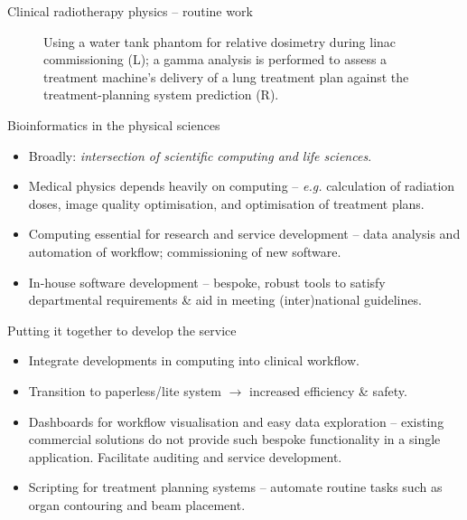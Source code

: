 \documentclass[final, unknownkeysallowed]{beamer}
\begin{document}
\begin{frame}{}
\begin{textblock}{19.5}
\begin{block}{Clinical radiotherapy physics -- routine work}
\begin{figure}
            \caption*{Using a water tank phantom for relative dosimetry during linac commissioning (L); a gamma analysis is performed to assess a treatment machine's delivery of a lung treatment plan against the treatment-planning system prediction (R).}\label{fig:watertank}
        \end{figure}
    \end{block}
%
    \begin{block}{Bioinformatics in the physical sciences}
        \begin{itemize}
            \item Broadly: \textit{intersection of scientific computing and life sciences}.
            \item Medical physics depends heavily on computing -- \textit{e.g.} calculation of radiation doses, image quality optimisation, and optimisation of treatment plans.
            \item Computing essential for research and service development -- data analysis and automation of workflow; commissioning of new software.
            \item In-house software development -- bespoke, robust tools to satisfy departmental requirements \& aid in meeting (inter)national guidelines.
        \end{itemize}
    \end{block}
%
    \begin{block}{Putting it together to develop the service}
        \begin{itemize}
            \item Integrate developments in computing into clinical workflow.
            \item Transition to paperless/lite system ${\rightarrow}$ increased efficiency \& safety.
            \item Dashboards for workflow visualisation and easy data exploration -- existing commercial solutions do not provide such bespoke functionality in a single application. Facilitate auditing and service development.
            \item Scripting for treatment planning systems -- automate routine tasks such as organ contouring and beam placement.
        \end{itemize}
    \end{block}


\end{textblock}
\end{frame}
\end{document}
